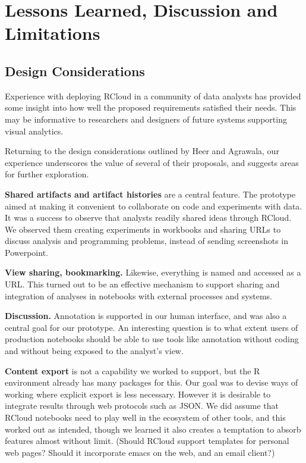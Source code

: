 \section{Lessons Learned, Discussion and Limitations}

\subsection{Design Considerations}

Experience with deploying RCloud in a community of data analysts
has provided some insight into how well the proposed requirements
satisfied their needs. This may be informative to researchers and
designers of future systems supporting visual analytics.

Returning to the design considerations outlined by Heer and Agrawala,
our experience underscores the value of several of their proposals,
and suggests areas for further exploration.

{\bf Shared artifacts and artifact histories} are a central feature.
The prototype aimed at making it convenient to collaborate on code
and experiments with data. It was a success to observe that analysts
readily shared ideas through RCloud. We observed them creating experiments
in workbooks and sharing URLs to discuss analysis and programming
problems, instead of sending screenshots in Powerpoint.

{\bf View sharing, bookmarking.} Likewise, everything is named
and accessed as a URL. This turned out to be an effective mechanism
to support sharing and integration of analyses in notebooks
with external processes and systems.

{\bf Discussion.} Annotation is supported in our human interface,
and was also a central goal for our prototype. 
An interesting question is to what extent users of production notebooks
should be able to use tools like annotation without coding and
without being exposed to the analyst's view.

{\bf Content export} is not a capability we worked to support,
but the R environment already has many packages for this.
Our goal was to devise ways of working where explicit export is
less necessary. However it is desirable to integrate results
through web protocols such as JSON. We did assume that RCloud
notebooks need to play well in the ecosystem of other tools,
and this worked out as intended, though we learned it also creates
a temptation to absorb features almost without limit. (Should
RCloud support templates for personal web pages? Should it
incorporate emacs on the web, and an email client?)

